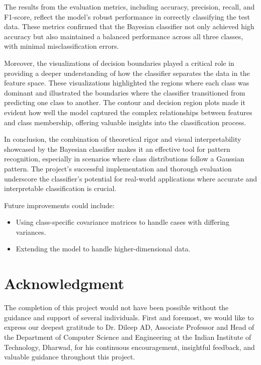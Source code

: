 \documentclass[conference]{IEEEtran}
\begin{document}
	The results from the evaluation metrics, including accuracy, precision, recall, and F1-score, reflect the model's robust performance in correctly classifying the test data. These metrics confirmed that the Bayesian classifier not only achieved high accuracy but also maintained a balanced performance across all three classes, with minimal misclassification errors.
	
	Moreover, the visualizations of decision boundaries played a critical role in providing a deeper understanding of how the classifier separates the data in the feature space. These visualizations highlighted the regions where each class was dominant and illustrated the boundaries where the classifier transitioned from predicting one class to another. The contour and decision region plots made it evident how well the model captured the complex relationships between features and class membership, offering valuable insights into the classification process.
	
	In conclusion, the combination of theoretical rigor and visual interpretability showcased by the Bayesian classifier makes it an effective tool for pattern recognition, especially in scenarios where class distributions follow a Gaussian pattern. The project's successful implementation and thorough evaluation underscore the classifier’s potential for real-world applications where accurate and interpretable classification is crucial.
	
	Future improvements could include:
	
	\begin{itemize}
		\item Using class-specific covariance matrices to handle cases with differing variances.
		\item Extending the model to handle higher-dimensional data.
	\end{itemize}
	
	\newpage
	\section*{Acknowledgment}
	
	The completion of this project would not have been possible without the guidance and support of several individuals. First and foremost, we would like to express our deepest gratitude to Dr. Dileep AD, Associate Professor and Head of the Department of Computer Science and Engineering at the Indian Institute of Technology, Dharwad, for his continuous encouragement, insightful feedback, and valuable guidance throughout this project.
	
\end{document}
